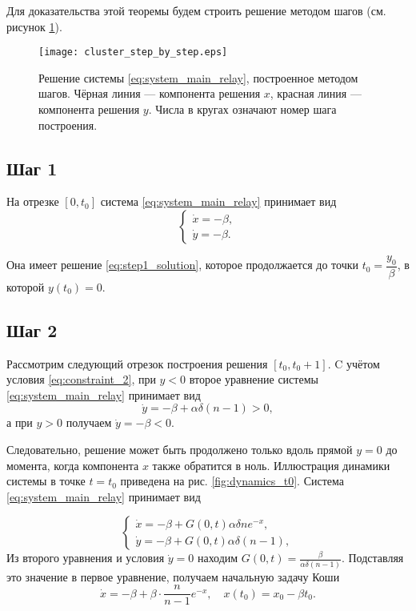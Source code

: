 Для доказательства этой теоремы будем строить решение методом шагов (см. рисунок \ref{fig:cluster_step_by_step}).

\begin{figure}[!ht]
	\centering
	\texttt{[image: cluster\_step\_by\_step.eps]}
	\caption{Решение системы \eqref{eq:system_main_relay}, построенное методом шагов. Чёрная линия --- компонента решения $x$, красная линия --- компонента решения $y$. Числа в кругах означают номер шага построения.}
	\label{fig:cluster_step_by_step}
\end{figure}


\subsection{Шаг 1}
На отрезке $[0, t_0]$ система \eqref{eq:system_main_relay} принимает вид
%
\begin{equation}
	\label{eq:step1_system}
	\begin{cases}
		\dot{x} = -\beta,\\
		\dot{y} = -\beta.
	\end{cases}
\end{equation}

Она имеет решение \eqref{eq:step1_solution}, которое продолжается до точки $t_0 = \dfrac{y_0}{\beta}$, в которой $y(t_0) = 0$.

\subsection{Шаг 2}

Рассмотрим следующий отрезок построения решения $[t_0, t_0 + 1]$. C учётом условия \eqref{eq:constraint_2}, при $y < 0$ второе уравнение системы \eqref{eq:system_main_relay} принимает вид
\[
\dot{y} = -\beta + \alpha \delta (n - 1) > 0,
\]
а при $y > 0$ получаем $\dot{y} = -\beta < 0$.

Следовательно, решение может быть продолжено только вдоль прямой $y = 0$ до момента, когда компонента $x$ также обратится в ноль. Иллюстрация динамики системы в точке $t= t_0$ приведена на рис. \ref{fig:dynamics_t0}. Система \eqref{eq:system_main_relay} принимает вид

\begin{equation}
	\label{eq:step2_system}
	\begin{cases}
		\dot{x} = -\beta + G(0, t) \alpha \delta n e^{-x},\\
		\dot{y} = -\beta + G(0, t) \alpha \delta (n - 1),
	\end{cases}
\end{equation}
%
Из второго уравнения и условия $\dot{y} = 0$ находим $G(0, t) = \frac{\beta}{\alpha \delta (n - 1)}$. Подставляя это значение в первое уравнение, получаем начальную задачу Коши
\begin{equation}
	\label{eq:step2_start}
	\dot{x} = -\beta + \beta\cdot\dfrac{n}{n - 1}e^{-x}, \quad x(t_0) = x_0 - \beta t_0.
\end{equation}

